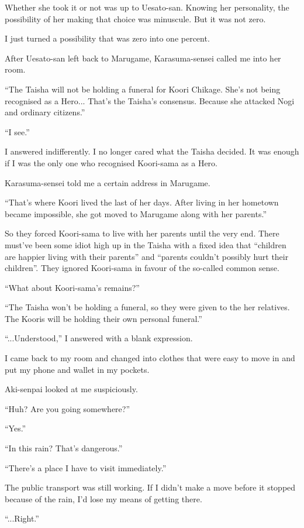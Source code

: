 Whether she took it or not was up to Uesato-san. Knowing her personality, the possibility of her making that choice was minuscule. But it was not zero.

I just turned a possibility that was zero into one percent.

After Uesato-san left back to Marugame, Karasuma-sensei called me into her room.

``The Taisha will not be holding a funeral for Koori Chikage. She's not being recognised as a Hero... That's the Taisha's consensus. Because she attacked Nogi and ordinary citizens.''

``I see.''

I answered indifferently. I no longer cared what the Taisha decided. It was enough if I was the only one who recognised Koori-sama as a Hero.

Karasuma-sensei told me a certain address in Marugame.

``That's where Koori lived the last of her days. After living in her hometown became impossible, she got moved to Marugame along with her parents.''

So they forced Koori-sama to live with her parents until the very end. There must've been some idiot high up in the Taisha with a fixed idea that ``children are happier living with their parents'' and ``parents couldn't possibly hurt their children''. They ignored Koori-sama in favour of the so-called common sense.

``What about Koori-sama's remains?''

``The Taisha won't be holding a funeral, so they were given to the her relatives. The Kooris will be holding their own personal funeral.''

``...Understood,'' I answered with a blank expression.

I came back to my room and changed into clothes that were easy to move in and put my phone and wallet in my pockets.

Aki-senpai looked at me suspiciously.

``Huh? Are you going somewhere?''

``Yes.''

``In this rain? That's dangerous.''

``There's a place I have to visit immediately.''

The public transport was still working. If I didn't make a move before it stopped because of the rain, I'd lose my means of getting there.

``...Right.''

